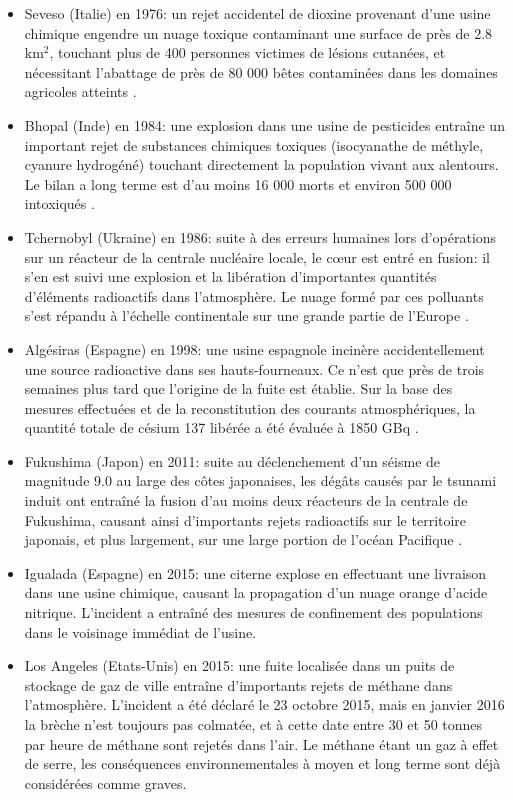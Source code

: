 	\begin{itemize}
		\item Seveso (Italie) en 1976: un rejet accidentel de dioxine provenant d'une usine chimique engendre un nuage toxique contaminant une surface de près de 2.8 km$^2$, touchant plus de 400 personnes victimes de lésions cutanées, et nécessitant l'abattage de près de 80 000 bêtes contaminées dans les domaines agricoles atteints \cite{Seveso1976}. 
		
		\item Bhopal (Inde) en 1984: une explosion dans une usine de pesticides entraîne un important rejet de substances chimiques toxiques (isocyanathe de méthyle, cyanure hydrogéné) touchant directement la population vivant aux alentours. Le bilan a long terme est d'au moins 16 000 morts et environ 500 000 intoxiqués \cite{Bhopal1984}.
		
		\item Tchernobyl (Ukraine) en 1986: suite à des erreurs humaines lors d'opérations sur un réacteur de la centrale nucléaire locale, le c\oe{}ur est entré en fusion: il s'en est suivi une explosion et la libération d'importantes quantités d'éléments radioactifs dans l'atmosphère. Le nuage formé par ces polluants s'est répandu à l'échelle continentale sur une grande partie de l'Europe \cite{Repussard2006}.
		
		\item Algésiras (Espagne) en 1998: une usine espagnole incinère accidentellement une source radioactive dans ses hauts-fourneaux. Ce n'est que près de trois semaines plus tard que l'origine de la fuite est établie. Sur la base des mesures effectuées et de la reconstitution des courants atmosphériques, la quantité totale de césium 137 libérée a été évaluée à 1850 GBq \cite{Estevan2003}.
		
		\item Fukushima (Japon) en 2011: suite au déclenchement d'un séisme de magnitude 9.0 au large des côtes japonaises, les dégâts causés par le tsunami induit ont entraîné la fusion d'au moins deux réacteurs de la centrale de Fukushima, causant ainsi d'importants rejets radioactifs sur le territoire japonais, et plus largement, sur une large portion de l'océan Pacifique \cite{IRSN2012}.
		
		\item Igualada (Espagne) en 2015: une citerne explose en effectuant une livraison dans une usine chimique, causant la propagation d'un nuage orange d'acide nitrique. L'incident a entraîné des mesures de confinement des populations dans le voisinage immédiat de l'usine.
		\item Los Angeles (Etats-Unis) en 2015: une fuite localisée dans un puits de stockage de gaz de ville entraîne d'importants rejets de méthane dans l'atmosphère. L'incident a été déclaré le 23 octobre 2015, mais en janvier 2016 la brèche n'est toujours pas colmatée, et à cette date entre 30 et 50 tonnes par heure de méthane sont rejetés dans l'air. Le méthane étant un gaz à effet de serre, les conséquences environnementales à moyen et long terme sont déjà considérées comme graves.\\
	\end{itemize}
	
